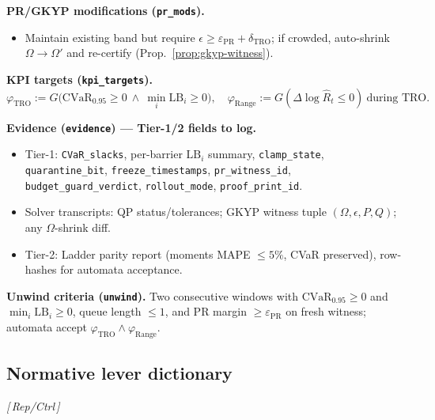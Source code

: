 \documentclass[10pt]{article}
\newcommand{\layertag}[1]{\textsf{\footnotesize[\,#1\,]}}
\providecommand{\constsymPRmargin}{\varepsilon_{\mathrm{PR}}}
\begin{document}
\noindent\textbf{PR/GKYP modifications (\texttt{pr\_mods}).}
\begin{itemize}[leftmargin=*]
\item Maintain existing band but require $\epsilon\ge\constsymPRmargin+\delta_{\mathrm{TRO}}$; if crowded, auto-shrink $\Omega\!\to\!\Omega'$ and re-certify (Prop.~\ref{prop:gkyp-witness}).
\end{itemize}

\noindent\textbf{KPI targets (\texttt{kpi\_targets}).}
\[
\varphi_{\text{TRO}}:=G\big(\mathrm{CVaR}_{0.95}\!\ge0\ \wedge\ \min_i \mathrm{LB}_i\!\ge0\big),\quad
\varphi_{\text{Range}}:=G(\Delta\log\hat R_t\le 0)\ \text{during TRO}.
\]

\noindent\textbf{Evidence (\texttt{evidence}) — Tier-1/2 fields to log.}
\begin{itemize}[leftmargin=*]
\item Tier-1: \texttt{CVaR\_slacks}, per-barrier $\mathrm{LB}_i$ summary, \texttt{clamp\_state}, \texttt{quarantine\_bit}, \texttt{freeze\_timestamps}, \texttt{pr\_witness\_id}, \texttt{budget\_guard\_verdict}, \texttt{rollout\_mode}, \texttt{proof\_print\_id}.
\item Solver transcripts: QP status/tolerances; GKYP witness tuple $(\Omega,\epsilon,P,Q)$; any $\Omega$-shrink diff.
\item Tier-2: Ladder parity report (moments MAPE $\le5\%$, CVaR preserved), row-hashes for automata acceptance.
\end{itemize}

\noindent\textbf{Unwind criteria (\texttt{unwind}).}
Two consecutive windows with $\mathrm{CVaR}_{0.95}\ge0$ and $\min_i \mathrm{LB}_i\ge0$, queue length $\le 1$, and PR margin $\ge\constsymPRmargin$ on fresh witness; automata accept $\varphi_{\text{TRO}}\wedge\varphi_{\text{Range}}$.

\subsection{Normative lever dictionary}\label{subsec:lever-dict}
\emph{\layertag{Rep/Ctrl}}
\end{document}
